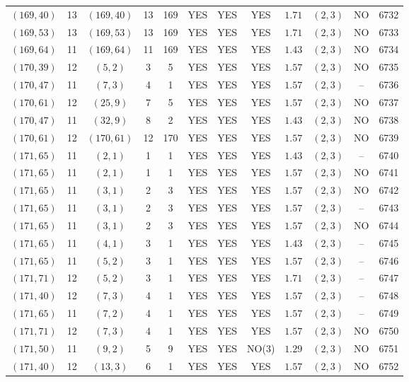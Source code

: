 \begin{longtable}{|c|c|c|c|c|c|c|c|c|c|c|c|}
$(169,40)$ & 13 & $(169,40)$ & 13 & 169 & YES & YES & YES & $1.71$ & $(2,3)$ & NO & 6732\\
$(169,53)$ & 13 & $(169,53)$ & 13 & 169 & YES & YES & YES & $1.71$ & $(2,3)$ & NO & 6733\\
$(169,64)$ & 11 & $(169,64)$ & 11 & 169 & YES & YES & YES & $1.43$ & $(2,3)$ & NO & 6734\\
$(170,39)$ & 12 & $(5,2)$ & 3 & 5 & YES & YES & YES & $1.57$ & $(2,3)$ & NO & 6735\\
$(170,47)$ & 11 & $(7,3)$ & 4 & 1 & YES & YES & YES & $1.57$ & $(2,3)$ & -- & 6736\\
$(170,61)$ & 12 & $(25,9)$ & 7 & 5 & YES & YES & YES & $1.57$ & $(2,3)$ & NO & 6737\\
$(170,47)$ & 11 & $(32,9)$ & 8 & 2 & YES & YES & YES & $1.43$ & $(2,3)$ & NO & 6738\\
$(170,61)$ & 12 & $(170,61)$ & 12 & 170 & YES & YES & YES & $1.57$ & $(2,3)$ & NO & 6739\\
$(171,65)$ & 11 & $(2,1)$ & 1 & 1 & YES & YES & YES & $1.43$ & $(2,3)$ & -- & 6740\\
$(171,65)$ & 11 & $(2,1)$ & 1 & 1 & YES & YES & YES & $1.57$ & $(2,3)$ & NO & 6741\\
$(171,65)$ & 11 & $(3,1)$ & 2 & 3 & YES & YES & YES & $1.57$ & $(2,3)$ & NO & 6742\\
$(171,65)$ & 11 & $(3,1)$ & 2 & 3 & YES & YES & YES & $1.57$ & $(2,3)$ & -- & 6743\\
$(171,65)$ & 11 & $(3,1)$ & 2 & 3 & YES & YES & YES & $1.57$ & $(2,3)$ & NO & 6744\\
$(171,65)$ & 11 & $(4,1)$ & 3 & 1 & YES & YES & YES & $1.43$ & $(2,3)$ & -- & 6745\\
$(171,65)$ & 11 & $(5,2)$ & 3 & 1 & YES & YES & YES & $1.57$ & $(2,3)$ & -- & 6746\\
$(171,71)$ & 12 & $(5,2)$ & 3 & 1 & YES & YES & YES & $1.71$ & $(2,3)$ & -- & 6747\\
$(171,40)$ & 12 & $(7,3)$ & 4 & 1 & YES & YES & YES & $1.57$ & $(2,3)$ & -- & 6748\\
$(171,65)$ & 11 & $(7,2)$ & 4 & 1 & YES & YES & YES & $1.57$ & $(2,3)$ & -- & 6749\\
$(171,71)$ & 12 & $(7,3)$ & 4 & 1 & YES & YES & YES & $1.57$ & $(2,3)$ & NO & 6750\\
$(171,50)$ & 11 & $(9,2)$ & 5 & 9 & YES & YES & NO(3) & $1.29$ & $(2,3)$ & NO & 6751\\
$(171,40)$ & 12 & $(13,3)$ & 6 & 1 & YES & YES & YES & $1.57$ & $(2,3)$ & NO & 6752\\

\end{longtable}
